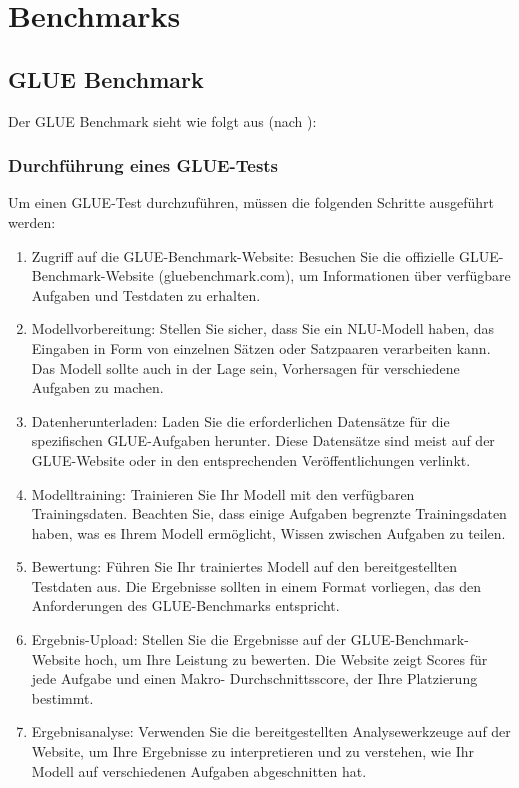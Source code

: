 \appendices
\section{Benchmarks}

\subsection{GLUE Benchmark}

Der GLUE Benchmark sieht wie folgt aus (nach \cite{wang_glue:_2019}):

\subsubsection*{Durchführung eines GLUE-Tests}

Um einen GLUE-Test durchzuführen, müssen die folgenden Schritte ausgeführt werden:

\begin{enumerate}
\item Zugriff auf die GLUE-Benchmark-Website: Besuchen Sie die offizielle GLUE-Benchmark-Website (gluebenchmark.com), um Informationen über verfügbare Aufgaben und Testdaten zu erhalten.
\item Modellvorbereitung: Stellen Sie sicher, dass Sie ein NLU-Modell haben, das Eingaben in Form von einzelnen Sätzen oder Satzpaaren verarbeiten kann. Das Modell sollte auch in der Lage sein, Vorhersagen für verschiedene Aufgaben zu machen.
\item Datenherunterladen: Laden Sie die erforderlichen Datensätze für die spezifischen GLUE-Aufgaben herunter. Diese Datensätze sind meist auf der GLUE-Website oder in den entsprechenden Veröffentlichungen verlinkt.
\item Modelltraining: Trainieren Sie Ihr Modell mit den verfügbaren Trainingsdaten. Beachten Sie, dass einige Aufgaben begrenzte Trainingsdaten haben, was es Ihrem Modell ermöglicht, Wissen zwischen Aufgaben zu teilen.
\item Bewertung: Führen Sie Ihr trainiertes Modell auf den bereitgestellten Testdaten aus. Die Ergebnisse sollten in einem Format vorliegen, das den Anforderungen des GLUE-Benchmarks entspricht.
\item Ergebnis-Upload: Stellen Sie die Ergebnisse auf der GLUE-Benchmark-Website hoch, um Ihre Leistung zu bewerten. Die Website zeigt Scores für jede Aufgabe und einen Makro- Durchschnittsscore, der Ihre Platzierung bestimmt.
\item Ergebnisanalyse: Verwenden Sie die bereitgestellten Analysewerkzeuge auf der Website, um Ihre Ergebnisse zu interpretieren und zu verstehen, wie Ihr Modell auf verschiedenen Aufgaben abgeschnitten hat.
\end{enumerate}

